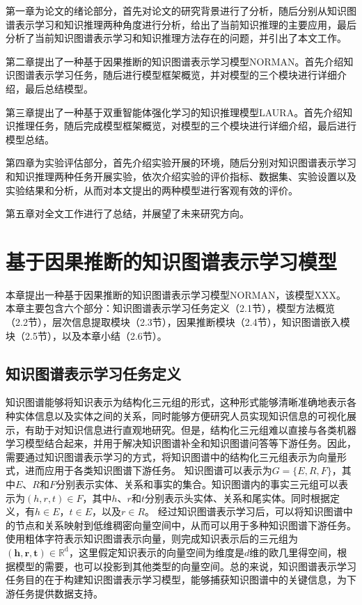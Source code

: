 \documentclass[algorithmlist, AutoFakeBold, AutoFakeSlant, figurelist, tablelist, nomlist, masters]{seuthesix}
\begin{document}
第一章为论文的绪论部分，首先对论文的研究背景进行了分析，随后分别从知识图谱表示学习和知识推理两种角度进行分析，给出了当前知识推理的主要应用，最后分析了当前知识图谱表示学习和知识推理方法存在的问题，并引出了本文工作。

第二章提出了一种基于因果推断的知识图谱表示学习模型NORMAN。首先介绍知识图谱表示学习任务，随后进行模型框架概览，并对模型的三个模块进行详细介绍，最后总结模型。

第三章提出了一种基于双重智能体强化学习的知识推理模型LAURA。首先介绍知识推理任务，随后完成模型框架概览，对模型的三个模块进行详细介绍，最后进行模型总结。

第四章为实验评估部分，首先介绍实验开展的环境，随后分别对知识图谱表示学习和知识推理两种任务开展实验，依次介绍实验的评价指标、数据集、实验设置以及实验结果和分析，从而对本文提出的两种模型进行客观有效的评价。

第五章对全文工作进行了总结，并展望了未来研究方向。


\chapter{基于因果推断的知识图谱表示学习模型}
本章提出一种基于因果推断的知识图谱表示学习模型NORMAN，该模型XXX。
本章主要包含六个部分：知识图谱表示学习任务定义（2.1节），模型方法概览（2.2节），层次信息提取模块（2.3节），因果推断模块（2.4节），知识图谱嵌入模块（2.5节），以及本章小结（2.6节）。

\section{知识图谱表示学习任务定义}
知识图谱能够将知识表示为结构化三元组的形式，这种形式能够清晰准确地表示各种实体信息以及实体之间的关系，同时能够方便研究人员实现知识信息的可视化展示，有助于对知识信息进行直观地研究。但是，结构化三元组难以直接与各类机器学习模型结合起来，并用于解决知识图谱补全和知识图谱问答等下游任务。因此，需要通过知识图谱表示学习的方式，将知识图谱中的结构化三元组表示为向量形式，进而应用于各类知识图谱下游任务。
知识图谱可以表示为$G=\{E, R, F\}$，其中$E$、$R$和$F$分别表示实体、关系和事实的集合。知识图谱内的事实三元组可以表示为$(h, r, t) \in F$，其中$h$、$r$和$t$分别表示头实体、关系和尾实体。同时根据定义，有$h \in E$，$t \in E$，以及$r \in R$。
经过知识图谱表示学习后，可以将知识图谱中的节点和关系映射到低维稠密向量空间中，从而可以用于多种知识图谱下游任务。使用粗体字符表示知识图谱表示向量，则完成知识表示后的三元组为$\left(\bm{h}, \bm{r}, \bm{t}\right) \in \mathbb{R}^{\mathrm{d}}$，这里假定知识表示的向量空间为维度是$d$维的欧几里得空间，根据模型的需要，也可以投影到其他类型的向量空间。总的来说，知识图谱表示学习任务目的在于构建知识图谱表示学习模型，能够捕获知识图谱中的关键信息，为下游任务提供数据支持。
\end{document}
